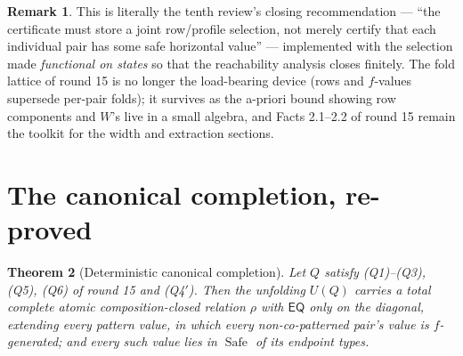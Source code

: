 \documentclass[11pt]{article}
\newtheorem{theorem}{Theorem}[section]
\theoremstyle{definition}
\newtheorem{remark}[theorem]{Remark}
\newcommand{\EQ}{\mathsf{EQ}}
\newcommand{\Safe}{\operatorname{Safe}}
\begin{document}
\begin{remark}
This is literally the tenth review's closing recommendation --- ``the
certificate must store a joint row/profile selection, not merely
certify that each individual pair has some safe horizontal value'' ---
implemented with the selection made \emph{functional on states} so that
the reachability analysis closes finitely.  The fold lattice of round
15 is no longer the load-bearing device (rows and $f$-values supersede
per-pair folds); it survives as the a-priori bound showing row
components and $W$'s live in a small algebra, and Facts 2.1--2.2 of
round 15 remain the toolkit for the width and extraction sections.
\end{remark}

\section{The canonical completion, re-proved}\label{sec:canon}

\begin{theorem}[Deterministic canonical completion]\label{thm:canon}
Let $Q$ satisfy (Q1)--(Q3), (Q5), (Q6) of round 15 and (Q4$'$).  Then
the unfolding $U(Q)$ carries a total complete atomic composition-closed
relation $\rho$ with $\EQ$ only on the diagonal, extending every
pattern value, in which every non-co-patterned pair's value is
$f$-generated; and every such value lies in
$\Safe$ of its endpoint types.
\end{theorem}
\end{document}
